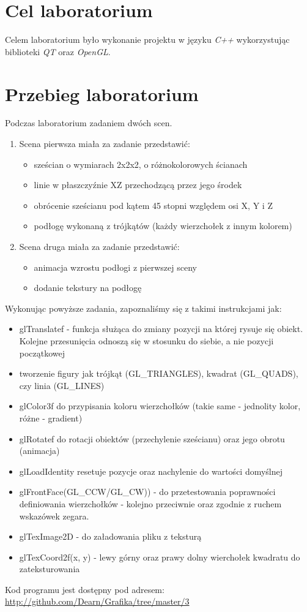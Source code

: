 \documentclass{article}
\begin{document}

\newpage
\section{Cel laboratorium}
Celem laboratorium było wykonanie projektu w języku \emph{C++} wykorzystując biblioteki \emph{QT} oraz \emph{OpenGL}.
\section{Przebieg laboratorium}
Podczas laboratorium zadaniem dwóch scen.
\begin{enumerate}
\item Scena pierwsza miała za zadanie przedstawić:
\begin{itemize}
\item sześcian o wymiarach 2x2x2, o różnokolorowych ścianach
\item linie w płaszczyźnie XZ przechodzącą przez jego środek
\item obrócenie sześcianu pod kątem 45 stopni względem osi X, Y i Z
\item podłogę wykonaną z trójkątów (każdy wierzchołek z innym kolorem)
\end{itemize}
\item Scena druga miała za zadanie przedstawić:
\begin{itemize}
\item animacja wzrostu podłogi z pierwszej sceny
\item dodanie tekstury na podłogę
\end{itemize}
\end{enumerate}

Wykonując powyższe zadania, zapoznaliśmy się z takimi instrukcjami jak:
\begin{itemize}
\item \textsf{glTranslatef} - funkcja służąca do zmiany pozycji na której rysuje się obiekt. Kolejne przesunięcia odnoszą się w stosunku do siebie, a nie pozycji początkowej
\item tworzenie figury jak trójkąt (\textsf{GL\_TRIANGLES}), kwadrat (\textsf{GL\_QUADS}), czy linia (\textsf{GL\_LINES})
\item \textsf{glColor3f} do przypisania koloru wierzchołków (takie same - jednolity kolor, różne - gradient)
\item \textsf{glRotatef} do rotacji obiektów (przechylenie sześcianu) oraz jego obrotu (animacja)
\item \textsf{glLoadIdentity} resetuje pozycje oraz nachylenie do wartości domyślnej
\item \textsf{glFrontFace}(\textsf{GL\_CCW}/\textsf{GL\_CW)}) - do przetestowania poprawności definiowania wierzchołków - kolejno przeciwnie oraz zgodnie z ruchem wskazówek zegara.
\item \textsf{glTexImage2D} - do załadowania pliku z teksturą
\item \textsf{glTexCoord2f(x, y)} - lewy górny oraz prawy dolny wierchołek kwadratu do zateksturowania
\end{itemize}
\vfill
Kod programu jest dostępny pod adresem: \url{http://github.com/Dearn/Grafika/tree/master/3}
\end{document}
